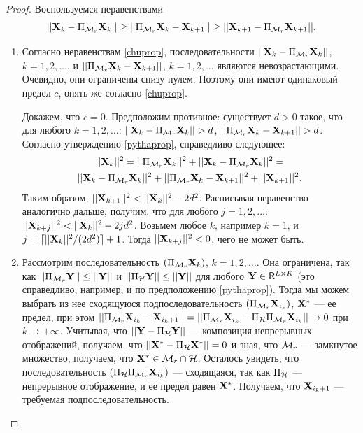 \documentclass[12pt,a4paper,fleqn,leqno]{article}
\begin{document}
\begin{proof}
Воспользуемся неравенствами \cite{Chu.etal2003}
\begin{equation}
\label{chuprop}
||\mathbf{X}_k - \Pi_{\mathcal{M}_r} \mathbf{X}_k|| \ge ||\Pi_{\mathcal{M}_r} \mathbf{X}_k - \mathbf{X}_{k + 1}|| \ge ||\mathbf{X}_{k+1} - \Pi_{\mathcal{M}_r} \mathbf{X}_{k + 1}||.
\end{equation}

\begin{enumerate}
\item Согласно неравенствам \eqref{chuprop}, последовательности $||\mathbf{X}_k - \Pi_{\mathcal{M}_r} \mathbf{X}_k||$, $k = 1, 2, \ldots$, и $||\Pi_{\mathcal{M}_r} \mathbf{X}_k - \mathbf{X}_{k + 1}||$, $k = 1, 2, \ldots$ являются невозрастающими. Очевидно, они ограничены снизу нулем. Поэтому они имеют одинаковый предел $c$, опять же согласно \eqref{chuprop}.

Докажем, что $c = 0$. Предположим противное: существует $d > 0$ такое, что для любого $k = 1, 2, \ldots$: $||\mathbf{X}_k - \Pi_{\mathcal{M}_r} \mathbf{X}_k|| > d$, $||\Pi_{\mathcal{M}_r} \mathbf{X}_k - \mathbf{X}_{k + 1}|| > d$. Согласно утверждению \ref{pythaprop}, справедливо следующее:
\begin{gather*}
||\mathbf{X}_k||^2 = ||\Pi_{\mathcal{M}_r} \mathbf{X}_k||^2 + ||\mathbf{X}_k - \Pi_{\mathcal{M}_r} \mathbf{X}_k||^2 =\\ ||\mathbf{X}_k - \Pi_{\mathcal{M}_r} \mathbf{X}_k||^2 + ||\Pi_{\mathcal{M}_r} \mathbf{X}_k - \mathbf{X}_{k + 1}||^2 + ||\mathbf{X}_{k + 1}||^2.
\end{gather*}
Таким образом, $||\mathbf{X}_{k+1}||^2 < ||\mathbf{X}_k||^2 - 2d^2$. Расписывая неравенство аналогично дальше, получим, что для любого $j = 1, 2, \ldots$: $||\mathbf{X}_{k+j}||^2 < ||\mathbf{X}_k||^2 - 2 j d^2$. Возьмем любое $k$, например $k = 1$, и $j = \lceil ||\mathbf{X}_k||^2 / (2d^2) \rceil + 1$. Тогда $||\mathbf{X}_{k+j}||^2 < 0$, чего не может быть.
\item Рассмотрим последовательность $(\Pi_{\mathcal{M}_r} \mathbf{X}_k)$, $k = 1, 2, \ldots$. Она ограничена, так как $||\Pi_{\mathcal{M}_r} \mathbf{Y}|| \le ||\mathbf{Y}||$ и $||\Pi_{\mathcal{H}} \mathbf{Y}|| \le ||\mathbf{Y}||$ для любого $\mathbf{Y} \in \mathsf{R}^{L \times K}$ (это справедливо, например, и по предположению \ref{pythaprop}). Тогда мы можем выбрать из нее сходящуюся подпоследовательность $(\Pi_{\mathcal{M}_r} \mathbf{X}_{i_k})$, $\mathbf{X}^*$ --- ее предел, при этом $||\Pi_{\mathcal{M}_r} \mathbf{X}_{i_k} - \mathbf{X}_{i_k + 1}|| = ||\Pi_{\mathcal{M}_r} \mathbf{X}_{i_k} - \Pi_{\mathcal{H}} \Pi_{\mathcal{M}_r} \mathbf{X}_{i_k}|| \to 0$ при $k \to + \infty$. Учитывая, что $||\mathbf{Y} - \Pi_{\mathcal{H}} \mathbf{Y}||$ --- композиция непрерывных отображений, получаем, что $||\mathbf{X}^* - \Pi_{\mathcal{H}} \mathbf{X}^*|| = 0$ и зная, что $\mathcal{M}_r$ --- замкнутое множество, получаем, что $\mathbf{X}^* \in \mathcal{M}_r \cap \mathcal{H}$. Осталось увидеть, что последовательность $(\Pi_{\mathcal{H}} \Pi_{\mathcal{M}_r} \mathbf{X}_{i_k})$ --- сходящаяся, так как $\Pi_{\mathcal{H}}$ --- непрерывное отображение, и ее предел равен $\mathbf{X}^*$. Получаем, что $\mathbf{X}_{i_k + 1}$ --- требуемая подпоследовательность.
\end{enumerate}
\end{proof}
\end{document}
